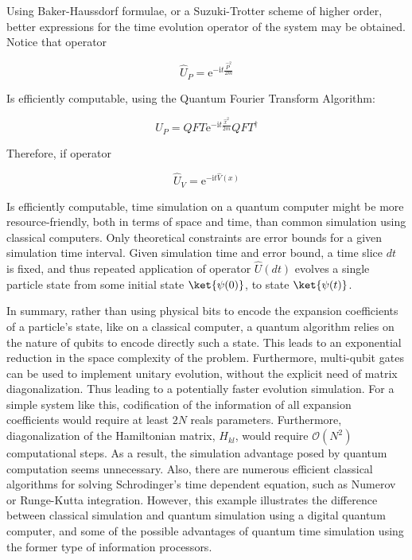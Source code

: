   Using Baker-Haussdorf formulae, or a Suzuki-Trotter scheme of higher order, better expressions for the time evolution operator of the system may be obtained. Notice that operator

  \[
  \hat{U}_P = \mathrm{e}^{-\mathrm{i}t \frac{\hat{P}^2}{2m}}
  \]

  Is efficiently computable, using the Quantum Fourier Transform Algorithm:

  \[
  \hat{U}_P = QFT\mathrm{e}^{-\mathrm{i}t \frac{\hat{x}^2}{2m}}QFT^{\dagger}
  \]

  Therefore, if operator

  \[
  \hat{U}_V = \mathrm{e}^{-\mathrm{i}t \hat{V}(x)}
  \]

  Is efficiently computable, time simulation on a quantum computer might be more resource-friendly, both in terms of space and time, than common simulation using classical computers. Only theoretical constraints are error bounds for a given simulation time interval. Given simulation time and error bound, a time slice $dt$ is fixed, and thus repeated application of operator $\hat{U}(dt)$ evolves a single particle state from some initial state $\ket{\psi(0)}$, to state $\ket{\psi(t)}$.

  

  In summary, rather than using physical bits to encode the expansion coefficients of a particle's state, like on a classical computer, a quantum algorithm relies on the nature of qubits to encode directly such a state. This leads to an exponential reduction in the space complexity of the problem. Furthermore, multi-qubit gates can be used to implement unitary evolution, without the explicit need of matrix diagonalization. Thus leading to a potentially faster evolution simulation. For a simple system like this, codification of the information of all expansion coefficients would require at least $2N$ reals parameters. Furthermore, diagonalization of the Hamiltonian matrix, $H_{kl}$, would require $\mathcal{O}(N^2)$ computational steps. As a result, the simulation advantage posed by quantum computation seems unnecessary. Also, there are numerous efficient classical algorithms for solving Schrodinger's time dependent equation, such as Numerov or Runge-Kutta integration. However, this example illustrates the difference between classical simulation and quantum simulation using a digital quantum computer, and some of the possible advantages of quantum time simulation using the former type of information processors.

